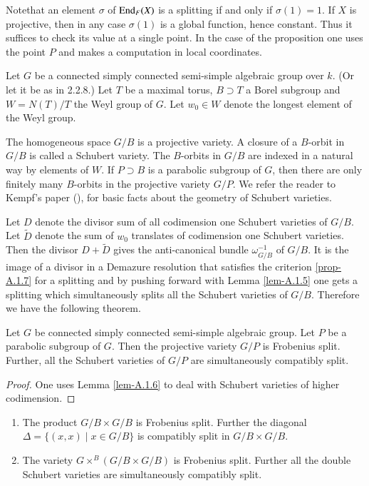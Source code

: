 Note\pageoriginale that\label{page78} an element $\sigma$ of $\operatorname{End}_{F}(X)$ is a
splitting if and only if $\sigma(1)=1$. If $X$ is projective, then in
any case $\sigma(1)$ is a global function, hence constant. Thus it
suffices to check its value at a single point. In the case of the
proposition one uses the point $P$ and makes a computation in local
coordinates. 

Let $G$ be a connected simply connected semi-simple algebraic group
over $k$. (Or let it be as in 2.2.8.) Let $T$ be a maximal torus,
$B\supset T$ a Borel subgroup and $W=N(T)/T$ the Weyl group of
$G$. Let $w_{0}\in W$ denote the longest element of the Weyl group.

The homogeneous space $G/B$ is a projective variety. A closure of a
$B$-orbit in $G/B$ is called a Schubert variety. The $B$-orbits in
$G/B$ are indexed in a natural way by elements of $W$. If $P\supset B$
is a parabolic subgroup of $G$, then there are only finitely many
$B$-orbits in the projective variety $G/P$. We refer the reader to
Kempf's paper (\cite{key14}), for basic facts about the geometry of
Schubert varieties.

Let $D$ denote the divisor sum of all codimension one Schubert
varieties of $G/B$. Let $\tilde{D}$ denote the sum of $w_{0}$
translates of codimension one Schubert varieties. Then the divisor
$D+\tilde{D}$ gives the anti-canonical bundle $\omega^{-1}_{G/B}$ of
$G/B$. It is the image of a divisor in a Demazure resolution that
satisfies the criterion \ref{prop-A.1.7} for a splitting and by
pushing forward with Lemma \ref{lem-A.1.5} one gets a splitting which
simultaneously splits all the Schubert varieties of $G/B$. Therefore
we have the following theorem.

\begin{theorem}\label{thm-A.1.8}
Let $G$ be connected simply connected semi-simple algebraic group. Let
$P$ be a parabolic subgroup of $G$. Then the projective variety $G/P$
is Frobenius split. Further, all the Schubert varieties of $G/P$ are
simultaneously compatibly split.
\end{theorem}

\begin{proof}
One uses Lemma \ref{lem-A.1.6} to deal with Schubert varieties of
higher codimension.
\end{proof}

\begin{theorem}\label{thm-A.1.9}
\begin{enumerate}
\renewcommand{\labelenumi}{\rm\theenumi.}
\item The product $G/B\times G/B$ is Frobenius split. Further the
  diagonal $\Delta=\{(x,x)\mid x\in G/B\}$ is compatibly split in
  $G/B\times G/B$.

\item The variety $G\times^{B}(G/B\times G/B)$ is Frobenius
  split. Further all the double Schubert varieties are simultaneously
  compatibly split.
\end{enumerate}
\end{theorem}

